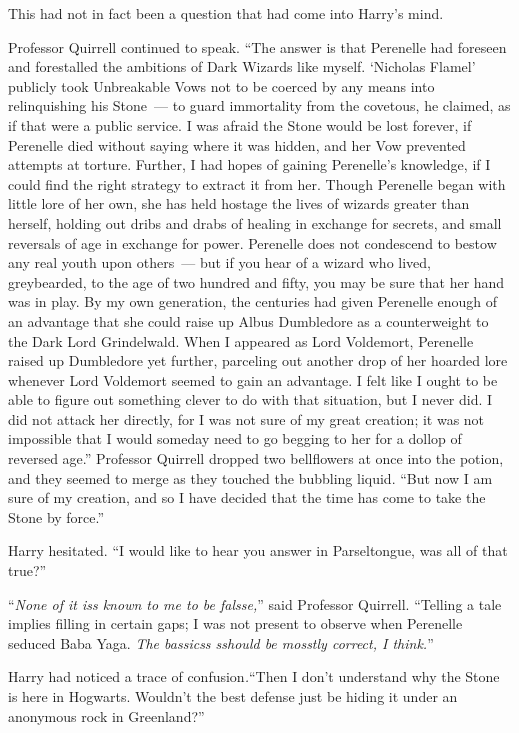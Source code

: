 This had not in fact been a question that had come into Harry's mind.

Professor Quirrell continued to speak. ``The answer is that Perenelle had foreseen and forestalled the ambitions of Dark Wizards like myself. `Nicholas Flamel' publicly took Unbreakable Vows not to be coerced by any means into relinquishing his Stone~--- to guard immortality from the covetous, he claimed, as if that were a public service. I was afraid the Stone would be lost forever, if Perenelle died without saying where it was hidden, and her Vow prevented attempts at torture. Further, I had hopes of gaining Perenelle's knowledge, if I could find the right strategy to extract it from her. Though Perenelle began with little lore of her own, she has held hostage the lives of wizards greater than herself, holding out dribs and drabs of healing in exchange for secrets, and small reversals of age in exchange for power. Perenelle does not condescend to bestow any real youth upon others~--- but if you hear of a wizard who lived, greybearded, to the age of two hundred and fifty, you may be sure that her hand was in play. By my own generation, the centuries had given Perenelle enough of an advantage that she could raise up Albus Dumbledore as a counterweight to the Dark Lord Grindelwald. When I appeared as Lord Voldemort, Perenelle raised up Dumbledore yet further, parceling out another drop of her hoarded lore whenever Lord Voldemort seemed to gain an advantage. I felt like I ought to be able to figure out something clever to do with that situation, but I never did. I did not attack her directly, for I was not sure of my great creation; it was not impossible that I would someday need to go begging to her for a dollop of reversed age.'' Professor Quirrell dropped two bellflowers at once into the potion, and they seemed to merge as they touched the bubbling liquid. ``But now I am sure of my creation, and so I have decided that the time has come to take the Stone by force.''

Harry hesitated. ``I would like to hear you answer in Parseltongue, was all of that true?''

``\emph{None of it iss known to me to be falsse,}'' said Professor Quirrell. ``Telling a tale implies filling in certain gaps; I was not present to observe when Perenelle seduced Baba Yaga. \emph{The bassicss sshould be mosstly correct, I think.}''

Harry had noticed a trace of confusion\emph{.}``Then I don't understand why the Stone is here in Hogwarts. Wouldn't the best defense just be hiding it under an anonymous rock in Greenland?''

